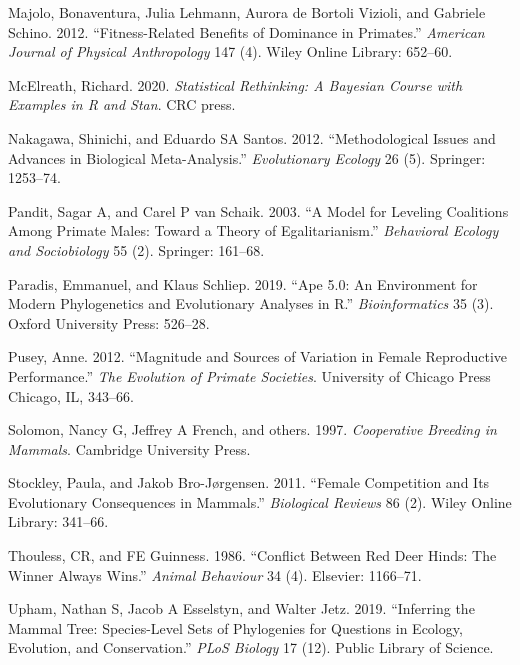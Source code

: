 \documentclass[]{article}
\begin{document}
\leavevmode\hypertarget{ref-majolo2012fitness}{}%
Majolo, Bonaventura, Julia Lehmann, Aurora de Bortoli Vizioli, and
Gabriele Schino. 2012. ``Fitness-Related Benefits of Dominance in
Primates.'' \emph{American Journal of Physical Anthropology} 147 (4).
Wiley Online Library: 652--60.

\leavevmode\hypertarget{ref-mcelreath2020statistical}{}%
McElreath, Richard. 2020. \emph{Statistical Rethinking: A Bayesian
Course with Examples in R and Stan}. CRC press.

\leavevmode\hypertarget{ref-nakagawa2012methodological}{}%
Nakagawa, Shinichi, and Eduardo SA Santos. 2012. ``Methodological Issues
and Advances in Biological Meta-Analysis.'' \emph{Evolutionary Ecology}
26 (5). Springer: 1253--74.

\leavevmode\hypertarget{ref-pandit2003model}{}%
Pandit, Sagar A, and Carel P van Schaik. 2003. ``A Model for Leveling
Coalitions Among Primate Males: Toward a Theory of Egalitarianism.''
\emph{Behavioral Ecology and Sociobiology} 55 (2). Springer: 161--68.

\leavevmode\hypertarget{ref-paradis2019ape}{}%
Paradis, Emmanuel, and Klaus Schliep. 2019. ``Ape 5.0: An Environment
for Modern Phylogenetics and Evolutionary Analyses in R.''
\emph{Bioinformatics} 35 (3). Oxford University Press: 526--28.

\leavevmode\hypertarget{ref-pusey2012magnitude}{}%
Pusey, Anne. 2012. ``Magnitude and Sources of Variation in Female
Reproductive Performance.'' \emph{The Evolution of Primate Societies}.
University of Chicago Press Chicago, IL, 343--66.

\leavevmode\hypertarget{ref-solomon1997cooperative}{}%
Solomon, Nancy G, Jeffrey A French, and others. 1997. \emph{Cooperative
Breeding in Mammals}. Cambridge University Press.

\leavevmode\hypertarget{ref-stockley2011female}{}%
Stockley, Paula, and Jakob Bro-Jørgensen. 2011. ``Female Competition and
Its Evolutionary Consequences in Mammals.'' \emph{Biological Reviews} 86
(2). Wiley Online Library: 341--66.

\leavevmode\hypertarget{ref-thouless1986conflict}{}%
Thouless, CR, and FE Guinness. 1986. ``Conflict Between Red Deer Hinds:
The Winner Always Wins.'' \emph{Animal Behaviour} 34 (4). Elsevier:
1166--71.

\leavevmode\hypertarget{ref-upham2019inferring}{}%
Upham, Nathan S, Jacob A Esselstyn, and Walter Jetz. 2019. ``Inferring
the Mammal Tree: Species-Level Sets of Phylogenies for Questions in
Ecology, Evolution, and Conservation.'' \emph{PLoS Biology} 17 (12).
Public Library of Science.
\end{document}
